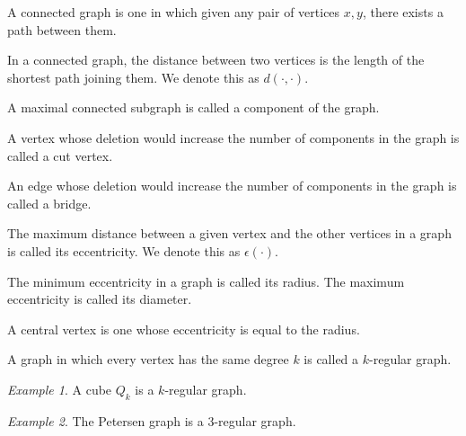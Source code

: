 \documentclass[11pt]{article}
\theoremstyle{definition}
\theoremstyle{remark}
\newtheorem*{example}{Example}
\numberwithin{equation}{section}
\begin{document}
    \begin{definition}
        A connected graph is one in which given any pair of vertices $x, y$, there
        exists a path between them.
    \end{definition}

    \begin{definition}
        In a connected graph, the distance between two vertices is the length of the
        shortest path joining them. We denote this as $d(\cdot, \cdot)$.
    \end{definition}

    \begin{definition}
        A maximal connected subgraph is called a component of the graph.
    \end{definition}

    \begin{definition}
        A vertex whose deletion would increase the number of components in the graph
        is called a cut vertex.
    \end{definition}

    \begin{definition}
        An edge whose deletion would increase the number of components in the graph
        is called a bridge.
    \end{definition}

    \begin{definition}
        The maximum distance between a given vertex and the other vertices in a graph
        is called its eccentricity. We denote this as $\epsilon(\cdot)$.
    \end{definition}

    \begin{definition}
        The minimum eccentricity in a graph is called its radius. The maximum
        eccentricity is called its diameter.

        A central vertex is one whose eccentricity is equal to the radius.
    \end{definition}

    \begin{definition}
        A graph in which every vertex has the same degree $k$ is called a $k$-regular
        graph.
    \end{definition}
    \begin{example}
        A cube $Q_k$ is a $k$-regular graph.
    \end{example}
    \begin{example}
        The Petersen graph is a 3-regular graph.
    \end{example}
\end{document}
